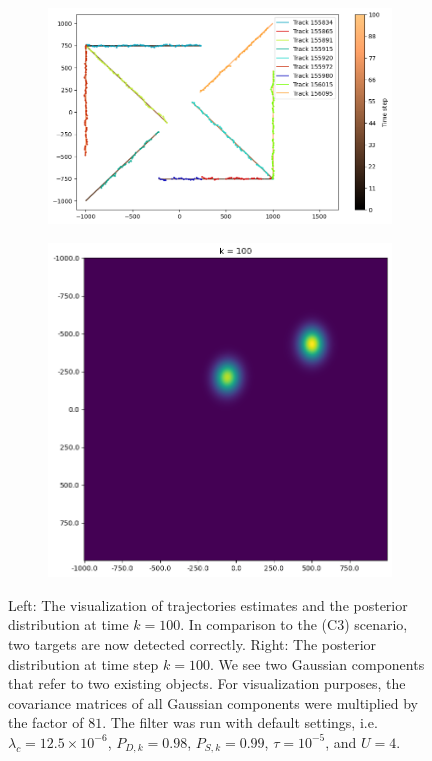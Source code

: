 \begin{figure}
    \centering
    \begin{subfigure}[]{0.48\linewidth}
        \centering
        \includegraphics[width=\linewidth]{figures/c4-traj.png}
    \end{subfigure}
    \hfill
    \begin{subfigure}[]{0.48\linewidth}
        \centering
        \includegraphics[width=\linewidth]{figures/c4-post.png}
    \end{subfigure}
  \caption[(C4). Trajectories estimations and the posterior intensity.]{Left: The visualization of trajectories estimates and the posterior distribution at time $k=100$. In comparison to the (C3) scenario, two targets are now detected correctly. Right: The posterior distribution at time step $k=100$. We see two Gaussian components that refer to two existing objects. For visualization purposes, the covariance matrices of all Gaussian components were multiplied by the factor of $81$. The filter was run with default settings, i.e. $\lambda_{c} = 12.5 \times 10^{-6}$, $P_{D,k} = 0.98$, $P_{S,k} = 0.99$, $\tau = 10^{-5}$, and $U=4$.}
  \label{fig:c4-traj-post}
\end{figure}

